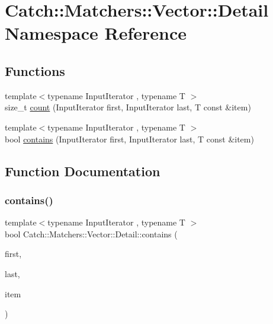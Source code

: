 \hypertarget{namespace_catch_1_1_matchers_1_1_vector_1_1_detail}{}\section{Catch\+:\+:Matchers\+:\+:Vector\+:\+:Detail Namespace Reference}
\label{namespace_catch_1_1_matchers_1_1_vector_1_1_detail}
\subsection*{Functions}
\begin{DoxyCompactItemize}
\item 
{\footnotesize template$<$typename Input\+Iterator , typename T $>$ }\\size\+\_\+t \mbox{\hyperlink{namespace_catch_1_1_matchers_1_1_vector_1_1_detail_abca18680db20c92f848b02a2c2708852}{count}} (Input\+Iterator first, Input\+Iterator last, T const \&item)
\item 
{\footnotesize template$<$typename Input\+Iterator , typename T $>$ }\\bool \mbox{\hyperlink{namespace_catch_1_1_matchers_1_1_vector_1_1_detail_a73a425534a3113c590fac55f64338d1e}{contains}} (Input\+Iterator first, Input\+Iterator last, T const \&item)
\end{DoxyCompactItemize}


\subsection{Function Documentation}
\mbox{\label{namespace_catch_1_1_matchers_1_1_vector_1_1_detail_a73a425534a3113c590fac55f64338d1e}} 
\subsubsection{\texorpdfstring{contains()}{contains()}}
{\footnotesize\ttfamily template$<$typename Input\+Iterator , typename T $>$ \\
bool Catch\+::\+Matchers\+::\+Vector\+::\+Detail\+::contains (\begin{DoxyParamCaption}\item[{Input\+Iterator}]{first,  }\item[{Input\+Iterator}]{last,  }\item[{T const \&}]{item }\end{DoxyParamCaption})}



